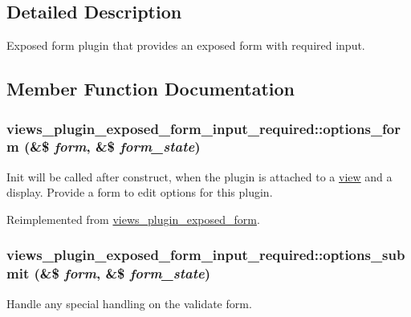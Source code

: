 \subsection{Detailed Description}
Exposed form plugin that provides an exposed form with required input. 

\subsection{Member Function Documentation}
\hypertarget{classviews__plugin__exposed__form__input__required_a11f06f82df74f11ecb72da72d0d3a1d5}{
\subsubsection[{options\_\-form}]{\setlength{\rightskip}{0pt plus 5cm}views\_\-plugin\_\-exposed\_\-form\_\-input\_\-required::options\_\-form (\&\$ {\em form}, \/  \&\$ {\em form\_\-state})}}
\label{classviews__plugin__exposed__form__input__required_a11f06f82df74f11ecb72da72d0d3a1d5}
Init will be called after construct, when the plugin is attached to a \hyperlink{classview}{view} and a display. Provide a form to edit options for this plugin. 

Reimplemented from \hyperlink{classviews__plugin__exposed__form_a546ecbe4ca1989a9e60a6228d0b8fb15}{views\_\-plugin\_\-exposed\_\-form}.\hypertarget{classviews__plugin__exposed__form__input__required_a579ab00684c29214329155a4a4de02c2}{
\subsubsection[{options\_\-submit}]{\setlength{\rightskip}{0pt plus 5cm}views\_\-plugin\_\-exposed\_\-form\_\-input\_\-required::options\_\-submit (\&\$ {\em form}, \/  \&\$ {\em form\_\-state})}}
\label{classviews__plugin__exposed__form__input__required_a579ab00684c29214329155a4a4de02c2}
Handle any special handling on the validate form. 

